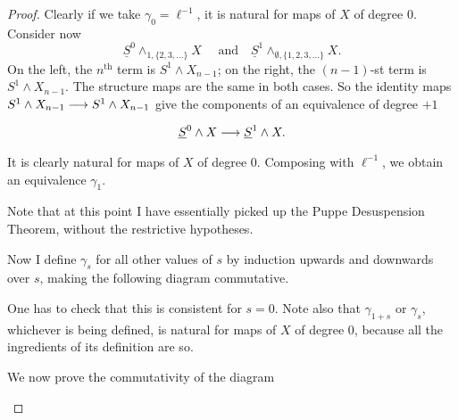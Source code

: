\documentclass[../main]{subfiles}
\begin{document}
\begin{proof}
Clearly if we take $\gamma_0 = \ell^{-1}$, it is natural for maps of $X$ of degree $0$. Consider now \[\underline S^0 \wedge_{1, \{2, 3, \ldots\}} X \quad \text { and} \quad \underline S^1 \wedge_{\emptyset, \{1, 2, 3, \ldots\}} X.\] On the left, the $n^{\mathrm{th}}$ term is $S^1 \wedge X_{n - 1}$; on the right, the $(n - 1)$-st term is $S^1 \wedge X_{n - 1}$. The structure maps are the same in both cases. So the identity maps $S^1 \wedge X_{n - 1} \lar{} S^1 \wedge X_{n - 1}$ give the components of an equivalence of degree $+1$ \[\underline S^0 \wedge X \lar{} \underline S^1 \wedge X.\] It is clearly natural for maps of $X$ of degree $0$. Composing with $\ell^{-1}$, we obtain an equivalence $\gamma_1$. 

Note that at this point I have essentially picked up the Puppe Desuspension Theorem, without the restrictive hypotheses.

Now I define $\gamma_s$ for all other values of $s$ by induction upwards and downwards over $s$, making the following diagram commutative. 

\begin{center}
\end{center}

One has to check that this is consistent for $s = 0$. Note also that $\gamma_{1 + s}$ or $\gamma_s$, whichever is being defined, is natural for maps of $X$ of degree $0$, because all the ingredients of its definition are so. 

We now prove the commutativity of the diagram

\begin{center}
\end{center}


\end{proof}
\end{document}
